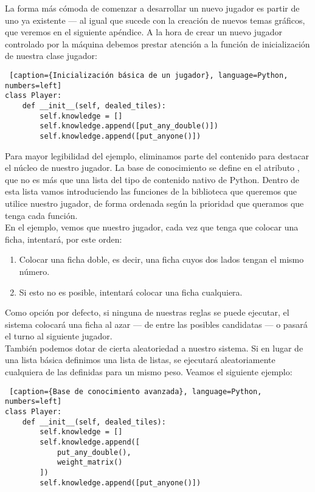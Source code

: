 La forma más cómoda de comenzar a desarrollar un nuevo jugador es partir de uno ya existente --- al igual que sucede
con la creación de nuevos temas gráficos, que veremos en el siguiente apéndice. A la hora de crear un nuevo jugador
controlado por la máquina debemos prestar atención a la función de inicialización de nuestra clase jugador:

\begin{lstlisting} [caption={Inicialización básica de un jugador}, language=Python, numbers=left]
class Player:
    def __init__(self, dealed_tiles):
        self.knowledge = []
        self.knowledge.append([put_any_double()])
        self.knowledge.append([put_anyone()])
\end{lstlisting}

Para mayor legibilidad del ejemplo, eliminamos parte del contenido para destacar el núcleo de nuestro jugador. La base de
conocimiento se define en el atributo , que no es más que una lista del tipo de contenido nativo de Python.
Dentro de esta lista vamos introduciendo las funciones de la biblioteca que queremos que utilice nuestro jugador, de forma
ordenada según la prioridad que queramos que tenga cada función. \\

En el ejemplo, vemos que nuestro jugador, cada vez que tenga que colocar una ficha, intentará, por este orden:
\begin{enumerate}
    \item Colocar una ficha doble, es decir, una ficha cuyos dos lados tengan el mismo número.
    \item Si esto no es posible, intentará colocar una ficha cualquiera.
\end{enumerate}

Como opción por defecto, si ninguna de nuestras reglas se puede ejecutar, el sistema colocará una ficha al azar --- de entre
las posibles candidatas --- o pasará el turno al siguiente jugador. \\

También podemos dotar de cierta aleatoriedad a nuestro sistema. Si en lugar de una lista básica definimos una lista de listas,
se ejecutará aleatoriamente cualquiera de las definidas para un mismo peso. Veamos el siguiente ejemplo:

\begin{lstlisting} [caption={Base de conocimiento avanzada}, language=Python, numbers=left]
class Player:
    def __init__(self, dealed_tiles):
        self.knowledge = []
        self.knowledge.append([
            put_any_double(),
            weight_matrix()
        ])
        self.knowledge.append([put_anyone()])
\end{lstlisting}

